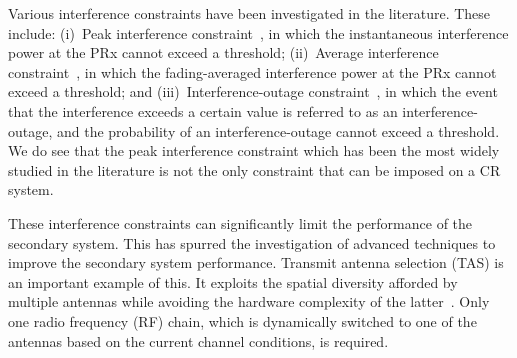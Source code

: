 \documentclass[12pt,draftcls,peerreview,onecolumn]{IEEEtran}
\begin{document}
Various interference constraints have been investigated in the literature. These include: (i)~Peak interference constraint~\cite{Fakhan_2014_TSP,Hanif_2015_globecom,Wang_2010_TWC, RZhang_2009_TWC}, in which  the instantaneous interference power at the PRx cannot exceed  a threshold; (ii)~Average interference constraint~\cite{ Sarvendranath_2013_TCOM,Wang_2011_TCom, Kashyap_2014_TCOM}, in which  the fading-averaged interference power at the PRx  cannot exceed  a threshold;  and (iii)~Interference-outage constraint~\cite{Kashyap_2014_TCOM,Rezki_2012_ieeeVt}, in which the event that the interference exceeds a certain value is referred to as an interference-outage, and the probability of an interference-outage cannot exceed a threshold. 	We do see that the peak interference constraint which has been the most widely studied in the literature is not the only constraint that can be imposed on a CR system. 

These interference constraints can significantly limit the performance of the secondary system. This has spurred the investigation of advanced techniques to improve the secondary system performance. Transmit antenna selection (TAS) is an important example of this. It exploits the spatial diversity afforded by multiple antennas while avoiding the hardware complexity of the latter~\cite{mehta_2012_ComMag}. Only one radio frequency (RF) chain, which is dynamically switched to one of the antennas based on the current channel conditions, is required. 
\end{document}
